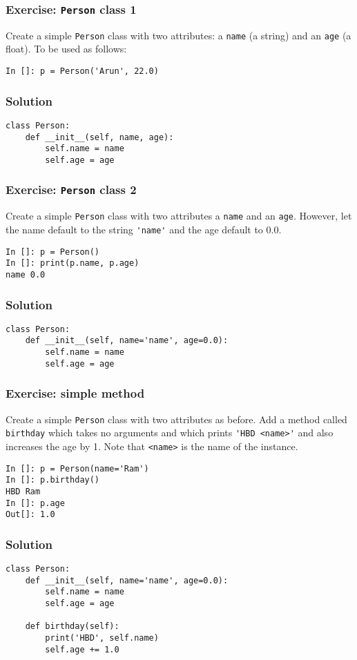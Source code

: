 \documentclass[14pt,compress,aspectratio=169]{beamer}
\begin{document}
\begin{frame}
  \frametitle{Exercise: \lstinline{Person} class 1}
  \begin{block}{}
    Create a simple \lstinline{Person} class with two attributes: a
    \lstinline{name} (a string) and an \lstinline{age} (a float).  To be used
    as follows:
  \end{block}
\begin{lstlisting}
In []: p = Person('Arun', 22.0)
\end{lstlisting}
\end{frame}


\begin{frame}
  \frametitle{Solution}
\begin{lstlisting}
class Person:
    def __init__(self, name, age):
        self.name = name
        self.age = age
\end{lstlisting}
\end{frame}

\begin{frame}
  \frametitle{Exercise: \lstinline{Person} class 2}
  \begin{block}{}
    Create a simple \lstinline{Person} class with two attributes a
    \lstinline{name} and an \lstinline{age}.  However, let the name default to
    the string \lstinline{'name'} and the age default to 0.0.
  \end{block}
\begin{lstlisting}
In []: p = Person()
In []: print(p.name, p.age)
name 0.0
\end{lstlisting}
\end{frame}

\begin{frame}
  \frametitle{Solution}
\begin{lstlisting}
class Person:
    def __init__(self, name='name', age=0.0):
        self.name = name
        self.age = age
\end{lstlisting}
\end{frame}

\begin{frame}
  \frametitle{Exercise: simple method}
  \begin{block}{}
    Create a simple \lstinline{Person} class with two attributes as before.
    Add a method called \lstinline{birthday} which takes no arguments and
    which prints \lstinline{'HBD <name>'} and also increases the age by 1.
    Note that \lstinline{<name>} is the name of the instance.
  \end{block}

\begin{lstlisting}
In []: p = Person(name='Ram')
In []: p.birthday()
HBD Ram
In []: p.age
Out[]: 1.0
\end{lstlisting}
\end{frame}

\begin{frame}
  \frametitle{Solution}
\begin{lstlisting}
class Person:
    def __init__(self, name='name', age=0.0):
        self.name = name
        self.age = age

    def birthday(self):
        print('HBD', self.name)
        self.age += 1.0
\end{lstlisting}
\end{frame}
\end{document}
